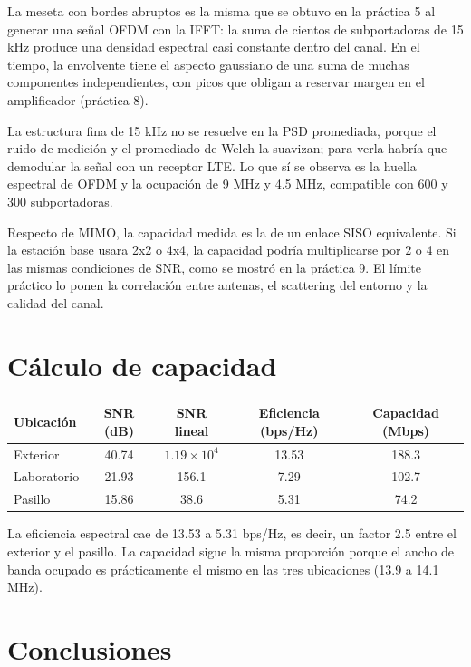 \documentclass[11pt,a4paper]{article}
\begin{document}

La meseta con bordes abruptos es la misma que se obtuvo en la práctica 5 al generar
una señal OFDM con la IFFT: la suma de cientos de subportadoras de 15 kHz produce una
densidad espectral casi constante dentro del canal. En el tiempo, la envolvente tiene el
aspecto gaussiano de una suma de muchas componentes independientes, con picos que obligan a
reservar margen en el amplificador (práctica 8).

La estructura fina de 15 kHz no se resuelve en la PSD promediada, porque el ruido de
medición y el promediado de Welch la suavizan; para verla habría que demodular la señal con
un receptor LTE. Lo que sí se observa es la huella espectral de OFDM y la ocupación de
9 MHz y 4.5 MHz, compatible con 600 y 300 subportadoras.

Respecto de MIMO, la capacidad medida es la de un enlace SISO equivalente. Si la estación
base usara 2x2 o 4x4, la capacidad podría multiplicarse por 2 o 4 en las mismas
condiciones de SNR, como se mostró en la práctica 9. El límite práctico lo ponen la
correlación entre antenas, el scattering del entorno y la calidad del canal.

\section{Cálculo de capacidad}

\begin{tabular}{@{}lcccc@{}}
  \toprule
  Ubicación & SNR (dB) & SNR lineal & Eficiencia (bps/Hz) & Capacidad (Mbps) \\
  \midrule
  Exterior    & 40.74 & $1.19\times10^{4}$ & 13.53 & 188.3 \\
  Laboratorio & 21.93 & 156.1              &  7.29 & 102.7 \\
  Pasillo     & 15.86 & 38.6               &  5.31 & 74.2 \\
  \bottomrule
\end{tabular}

La eficiencia espectral cae de 13.53 a 5.31 bps/Hz, es decir, un factor 2.5 entre el
exterior y el pasillo. La capacidad sigue la misma proporción porque el ancho de banda
ocupado es prácticamente el mismo en las tres ubicaciones (13.9 a 14.1 MHz).

\section{Conclusiones}
\end{document}

